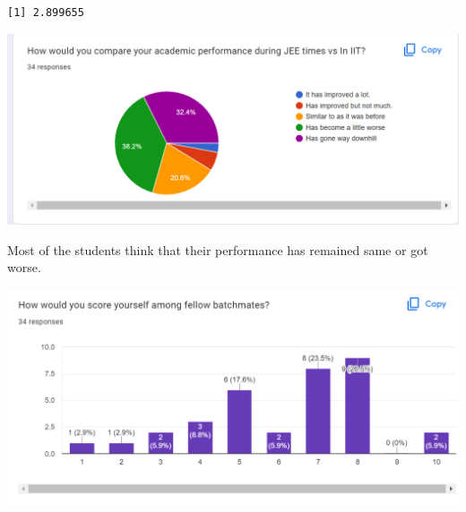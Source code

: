 \documentclass[
  letterpaper,
  DIV=11,
  numbers=noendperiod]{scrartcl}
\begin{document}
\begin{verbatim}
[1] 2.899655
\end{verbatim}

\includegraphics{Screenshot (388).png}

Most of the students think that their performance has remained same or
got worse.

\includegraphics{Screenshot (389).png}
\end{document}
